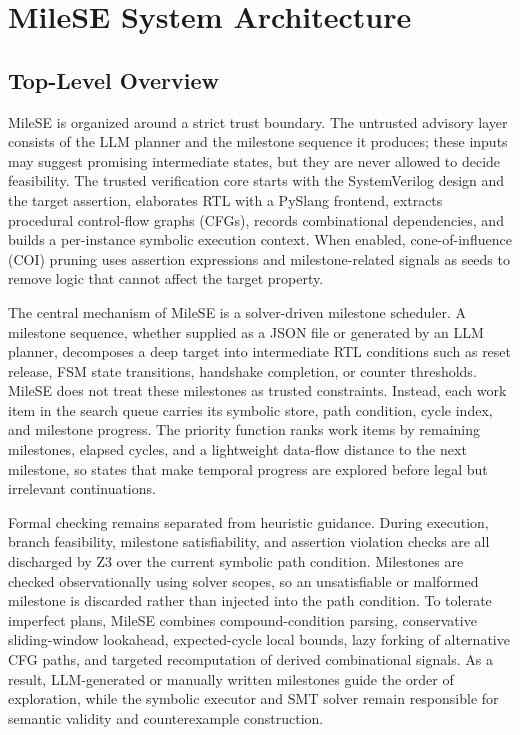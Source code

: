 \documentclass[conference]{IEEEtran}
\begin{document}
\section{MileSE System Architecture}
\label{sec:architecture}
\subsection{Top-Level Overview}
MileSE is organized around a strict trust boundary. The untrusted advisory layer consists of the LLM planner and the milestone sequence it produces; these inputs may suggest promising intermediate states, but they are never allowed to decide feasibility. The trusted verification core starts with the SystemVerilog design and the target assertion, elaborates RTL with a PySlang frontend, extracts procedural control-flow graphs (CFGs), records combinational dependencies, and builds a per-instance symbolic execution context. When enabled, cone-of-influence (COI) pruning uses assertion expressions and milestone-related signals as seeds to remove logic that cannot affect the target property.

The central mechanism of MileSE is a solver-driven milestone scheduler. A milestone sequence, whether supplied as a JSON file or generated by an LLM planner, decomposes a deep target into intermediate RTL conditions such as reset release, FSM state transitions, handshake completion, or counter thresholds. MileSE does not treat these milestones as trusted constraints. Instead, each work item in the search queue carries its symbolic store, path condition, cycle index, and milestone progress. The priority function ranks work items by remaining milestones, elapsed cycles, and a lightweight data-flow distance to the next milestone, so states that make temporal progress are explored before legal but irrelevant continuations.

Formal checking remains separated from heuristic guidance. During execution, branch feasibility, milestone satisfiability, and assertion violation checks are all discharged by Z3 over the current symbolic path condition. Milestones are checked observationally using solver scopes, so an unsatisfiable or malformed milestone is discarded rather than injected into the path condition. To tolerate imperfect plans, MileSE combines compound-condition parsing, conservative sliding-window lookahead, expected-cycle local bounds, lazy forking of alternative CFG paths, and targeted recomputation of derived combinational signals. As a result, LLM-generated or manually written milestones guide the order of exploration, while the symbolic executor and SMT solver remain responsible for semantic validity and counterexample construction.
\end{document}
